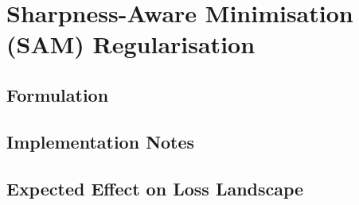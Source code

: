 \documentclass[../main.tex]{subfiles}
\begin{document}
\section{Sharpness-Aware Minimisation (SAM) Regularisation}
\label{sec:method-sam}


\subsection{Formulation}
\label{sec:sam-formulation}

\subsection{Implementation Notes}
\label{sec:sam-implementation}

\subsection{Expected Effect on Loss Landscape}
\label{sec:sam-expected-effect}
\end{document}
